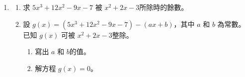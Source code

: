 \documentclass[11pt]{article}
\begin{document}
\begin{enumerate}
            \hrulefill
                
            \hrulefill
            
            \hrulefill
            
            \hrulefill
            
            \hrulefill
            
            \hrulefill
            
            \hrulefill
            
            \hrulefill
            
            \hrulefill
            
            \hrulefill
            
            \hrulefill
            
            \hrulefill
            
            \hrulefill
            
            \hrulefill
            
            \hrulefill
            
            \hrulefill

            \hrulefill
            
            \hrulefill
            
            \hrulefill
            
            \hrulefill

            \hrulefill
            
            \hrulefill
            
            \hrulefill
            
            \hrulefill
            
            \hrulefill
            
            \hrulefill
            
            \hrulefill
            
            \hrulefill
            
            \hrulefill
            
            \hrulefill

        \pagebreak
        \item \begin{enumerate}
            \item 求 $5x^3+12x^2-9x-7$ 被 $x^2+2x-3$所除時的餘數。
            \item 設 $g(x)=(5x^3+12x^2-9x-7)-(ax+b)$，其中 $a$ 和 $b$ 為常數。 已知 $g(x)$ 可被 $x^2+2x-3$整除。\begin{enumerate}
                \item 寫出 $a$ 和 $b$的值。
                \item 解方程 $g(x)=0$。
            \end{enumerate}
        \end{enumerate}


\end{enumerate}
\end{document}

